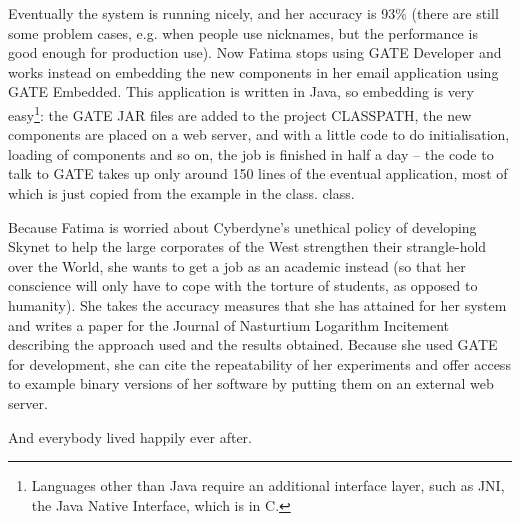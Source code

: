 Eventually the system is running nicely, and her accuracy is 93\%
(there are still some problem cases, e.g. when people use nicknames,
but the performance is good enough for production use). Now Fatima
stops using GATE Developer and works instead on embedding the new
components in her email application using GATE Embedded. This
application is written in Java, so embedding is very
easy\footnote{Languages other than Java require an additional
interface layer, such as JNI, the Java Native Interface, which is in
C.}: the GATE JAR files are added to the project CLASSPATH, the
new components are placed on a web server, and with a little code to
do initialisation, loading of components and so on, the job is
finished in half a day -- the code to talk to GATE takes up only
around 150 lines of the eventual application, most of which is just
copied from the example in the
\ifprintedbook
 class.
\else
{} class.
\fi

Because Fatima is worried about Cyberdyne's unethical policy of developing
Skynet to help the large corporates of the West strengthen their
strangle-hold over the World, she wants to get a job as an academic instead
(so that her conscience will only have to cope with the torture of students,
as opposed to humanity). She takes the accuracy measures that she has
attained for her system and writes a paper for the Journal of Nasturtium
Logarithm Incitement describing the approach used and the results obtained.
Because she used GATE for development, she can cite the repeatability of her
experiments and offer access to example binary versions of her software by
putting them on an external web server.

And everybody lived happily ever after.



